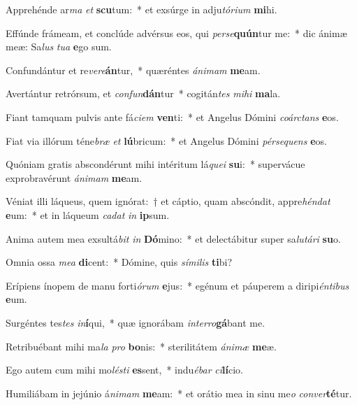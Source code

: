 \item Apprehénde ar\textit{ma} \textit{et} \textbf{scu}tum:~* et exsúrge in adju\textit{tó}\textit{ri}\textit{um} \textbf{mi}hi.
\item Effúnde frámeam, et conclúde advérsus eos, qui \textit{per}\textit{se}\textbf{quún}tur me:~* dic ánimæ meæ: Sa\textit{lus} \textit{tu}\textit{a} \textbf{e}go sum.
\item Confundántur et re\textit{ve}\textit{re}\textbf{án}tur,~* quæréntes \textit{á}\textit{ni}\textit{mam} \textbf{me}am.
\item Avertántur retrórsum, et \textit{con}\textit{fun}\textbf{dán}tur~* cogitán\textit{tes} \textit{mi}\textit{hi} \textbf{ma}la.
\item Fiant tamquam pulvis ante fá\textit{ci}\textit{em} \textbf{ven}ti:~* et Angelus Dómini \textit{co}\textit{árc}\textit{tans} \textbf{e}os.
\item Fiat via illórum téne\textit{bræ} \textit{et} \textbf{lú}bricum:~* et Angelus Dómini \textit{pér}\textit{se}\textit{quens} \textbf{e}os.
\item Quóniam gratis abscondérunt mihi intéritum lá\textit{que}\textit{i} \textbf{su}i:~* supervácue exprobravérunt \textit{á}\textit{ni}\textit{mam} \textbf{me}am.
\item Véniat illi láqueus, quem ignórat:~† et cáptio, quam abscóndit, appre\textit{hén}\textit{dat} \textbf{e}um:~* et in láqueum \textit{ca}\textit{dat} \textit{in} \textbf{ip}sum.
\item Anima autem mea exsultá\textit{bit} \textit{in} \textbf{Dó}mino:~* et delectábitur super sa\textit{lu}\textit{tá}\textit{ri} \textbf{su}o.
\item Omnia ossa \textit{me}\textit{a} \textbf{di}cent:~* Dómine, quis \textit{sí}\textit{mi}\textit{lis} \textbf{ti}bi?
\item Erípiens ínopem de manu forti\textit{ó}\textit{rum} \textbf{e}jus:~* egénum et páuperem a diripi\textit{én}\textit{ti}\textit{bus} \textbf{e}um.
\item Surgéntes tes\textit{tes} \textit{in}\textbf{í}qui,~* quæ ignorábam \textit{in}\textit{ter}\textit{ro}\textbf{gá}bant me.
\item Retribuébant mihi ma\textit{la} \textit{pro} \textbf{bo}nis:~* sterilitátem \textit{á}\textit{ni}\textit{mæ} \textbf{me}æ.
\item Ego autem cum mihi mo\textit{lés}\textit{ti} \textbf{es}sent,~* indu\textit{é}\textit{bar} \textit{ci}\textbf{lí}cio.
\item Humiliábam in jejúnio á\textit{ni}\textit{mam} \textbf{me}am:~* et orátio mea in sinu me\textit{o} \textit{con}\textit{ver}\textbf{té}tur.
